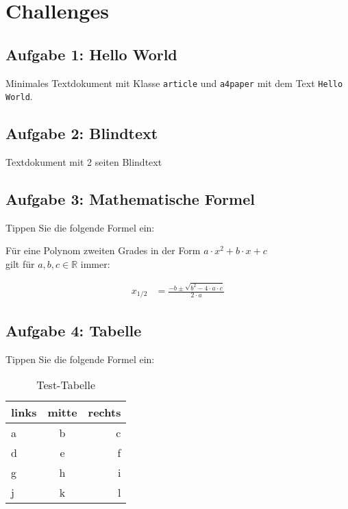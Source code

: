 \documentclass[
    ngerman,
    accentcolor=3b,
    dark_mode,
    fontsize= 12pt,
    a4paper,
    aspectratio=169,
    colorback=true,
    fancy_row_colors,
    leqno,
    fleqn,
    boxarc=3pt,
    fleqn,
    design=2008,
]{algoslides}
\begin{document}
    \section{Challenges}\label{4}\label{Challenges}
    \subsection{Aufgabe 1: Hello World}
    \begin{frame}[fragile]
        \slidehead{}
        Minimales Textdokument mit Klasse \texttt{article} und \texttt{a4paper} mit dem Text \verb+Hello World+.
    \end{frame}
    \subsection{Aufgabe 2: Blindtext}
    \begin{frame}[fragile]
        \slidehead{}
        Textdokument mit 2 seiten Blindtext
    \end{frame}
    \subsection{Aufgabe 3: Mathematische Formel}
    \begin{frame}[fragile]
        \slidehead{}
        Tippen Sie die folgende Formel ein:
        \begin{defBox}
            Für eine Polynom zweiten Grades in der Form $a\cdot x^2+b\cdot x + c$ \\gilt für $a,b,c \in \mathbb{R}$ immer:%

            \begin{align}
                x_{1/2} & =\frac{-b\pm\sqrt{b^{2}-4\cdot a \cdot c}}{2\cdot a}
            \end{align}

        \end{defBox}
    \end{frame}
    \subsection{Aufgabe 4: Tabelle}
    \begin{frame}[fragile]
        \slidehead{}
        Tippen Sie die folgende Formel ein:
        \begin{table}[ht]
            \centering
            \begin{tabular}{l|c|r}
                \textbf{links} & \textbf{mitte} & \textbf{rechts} \\
                \hline
                a              & b              & c               \\
                d              & e              & f               \\
                g              & h              & i               \\
                j              & k              & l
            \end{tabular}
            \caption{Test-Tabelle}
            \label{tab:Test}
        \end{table}
    \end{frame}
\end{document}
